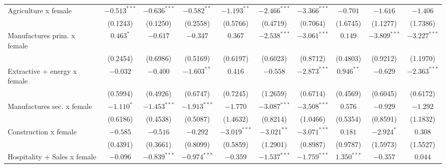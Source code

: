 \begin{tabular}{l|ccc|ccc|ccc|}
Agriculture x female             &  $-0.513^{***}$ &  $-0.636^{***}$ &   $-0.582^{**}$ &   $-1.193^{**}$ &  $-2.466^{***}$ &  $-3.366^{***}$ &        $-0.701$ &        $-1.616$ &        $-1.406$ \\
                                 &        (0.1243) &        (0.1250) &        (0.2558) &        (0.5766) &        (0.4719) &        (0.7064) &        (1.6745) &        (1.1277) &        (1.7386) \\
Manufactures prim. x female      &       $0.463^*$ &        $-0.617$ &        $-0.347$ &         $0.367$ &  $-2.538^{***}$ &  $-3.061^{***}$ &         $0.149$ &  $-3.809^{***}$ &  $-3.227^{***}$ \\
                                 &        (0.2454) &        (0.6986) &        (0.5169) &        (0.6197) &        (0.6023) &        (0.8712) &        (0.4803) &        (0.9212) &        (1.1970) \\
Extractive + energy x female     &        $-0.032$ &        $-0.400$ &   $-1.603^{**}$ &         $0.416$ &        $-0.558$ &  $-2.873^{***}$ &    $0.946^{**}$ &        $-0.629$ &  $-2.363^{***}$ \\
                                 &        (0.5994) &        (0.4926) &        (0.6747) &        (0.7245) &        (1.2659) &        (0.6714) &        (0.4569) &        (0.6045) &        (0.6172) \\
Manufactures sec. x female       &      $-1.110^*$ &  $-1.453^{***}$ &  $-1.913^{***}$ &        $-1.770$ &  $-3.087^{***}$ &  $-3.508^{***}$ &         $0.576$ &        $-0.929$ &        $-1.292$ \\
                                 &        (0.6186) &        (0.4538) &        (0.5087) &        (1.4632) &        (0.8214) &        (1.0466) &        (0.5354) &        (0.8591) &        (1.1832) \\
Construction x female            &        $-0.585$ &        $-0.516$ &        $-0.292$ &  $-3.019^{***}$ &   $-3.021^{**}$ &  $-3.071^{***}$ &         $0.181$ &      $-2.924^*$ &         $0.308$ \\
                                 &        (0.4391) &        (0.3661) &        (0.8099) &        (0.5859) &        (1.2901) &        (0.8987) &        (0.9787) &        (1.5973) &        (1.5527) \\
Hospitality + Sales x female     &        $-0.096$ &  $-0.839^{***}$ &  $-0.974^{***}$ &        $-0.359$ &  $-1.537^{***}$ &  $-1.759^{***}$ &   $1.350^{***}$ &        $-0.357$ &         $0.044$ \\

\end{tabular}
